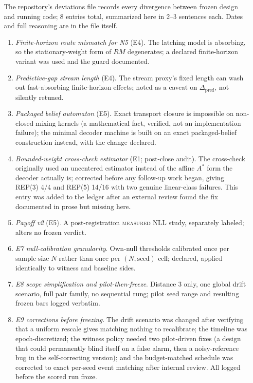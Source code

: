 \documentclass[11pt]{article}
\newcommand{\grade}[1]{\textsc{#1}}
\newcommand{\gMeasured}{\grade{measured}}
\theoremstyle{definition}
\begin{document}
The repository's deviations file records every divergence between frozen design and running code; 8 entries total, summarized here in 2--3 sentences each. Dates and full reasoning are in the file itself. 

\begin{enumerate}
\item \emph{Finite-horizon route mismatch for N5} (E4). The latching model is absorbing, so the stationary-weight form of $RM$ degenerates; a declared finite-horizon variant was used and the guard documented. \item \emph{Predictive-gap stream length} (E4). The stream proxy's fixed length can wash out fast-absorbing finite-horizon effects; noted as a caveat on $\Delta_{\mathrm{pred}}$, not silently retuned. \item \emph{Packaged belief automaton} (E5). Exact transport closure is impossible on non-closed mixing kernels (a mathematical fact, verified, not an implementation failure); the minimal decoder machine is built on an exact packaged-belief construction instead, with the change declared. \item \emph{Bounded-weight cross-check estimator} (E1; post-close audit). The cross-check originally used an uncentered estimator instead of the affine $A^{*}$ form the decoder actually is; corrected before any follow-up work began, giving REP(3) 4/4 and REP(5) 14/16 with two genuine linear-class failures. This entry was added to the ledger after an external review found the fix documented in prose but missing here. \item \emph{Payoff v2} (E5). A post-registration \gMeasured{} NLL study, separately labeled; alters no frozen verdict. \item \emph{E7 null-calibration granularity}. Own-null thresholds calibrated once per sample size $N$ rather than once per $(N, \mathrm{seed})$ cell; declared, applied identically to witness and baseline sides. \item \emph{E8 scope simplification and pilot-then-freeze}. Distance 3 only, one global drift scenario, full pair family, no sequential rung; pilot seed range and resulting frozen bars logged verbatim. \item \emph{E9 corrections before freezing}. The drift scenario was changed after verifying that a uniform rescale gives matching nothing to recalibrate; the timeline was epoch-discretized; the witness policy needed two pilot-driven fixes (a design that could permanently blind itself on a false alarm, then a noisy-reference bug in the self-correcting version); and the budget-matched schedule was corrected to exact per-seed event matching after internal review. All logged before the scored run froze. \end{enumerate}
\end{document}
